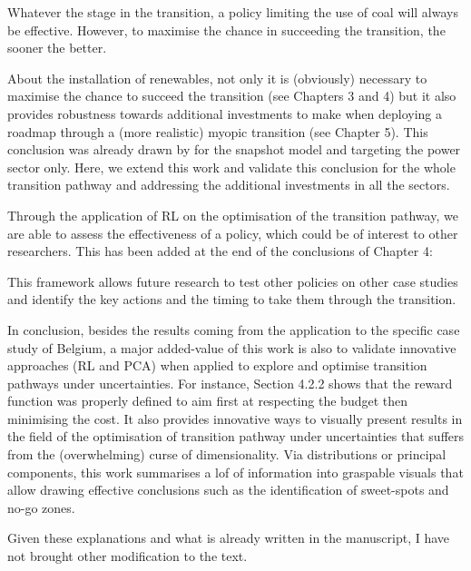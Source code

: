 \documentclass[12pt,a4paper]{article}
\begin{document}
\begin{mdframed}[style=manuscript] 
Whatever the stage in the transition, a policy limiting the use of coal will always be effective. However, to maximise the chance in succeeding the transition, the sooner the better.
\end{mdframed}

About the installation of renewables, not only it is (obviously) necessary to maximise the chance to succeed the transition (see Chapters 3 and 4) but it also provides robustness towards additional investments to make when deploying a roadmap through a (more realistic) myopic transition (see Chapter 5). This conclusion was already drawn by \citet{moret2020overcapacity} for the snapshot model and targeting the power sector only. Here, we extend this work and validate this conclusion for the whole transition pathway and addressing the additional investments in all the sectors.

Through the application of RL on the optimisation of the transition pathway, we are able to assess the effectiveness of a policy, which could be of interest to other researchers. This has been added {\color{blue}at the end of the conclusions of Chapter 4}:

\begin{mdframed}[style=manuscript] 
This framework allows future research to test other policies on other case studies and identify the key actions and the timing to take them through the transition.
\end{mdframed}

In conclusion, besides the results coming from the application to the specific case study of Belgium, a major added-value of this work is also to validate innovative approaches (RL and PCA) when applied to explore and optimise transition pathways under uncertainties. For instance, Section 4.2.2 shows that the reward function was properly defined to aim first at respecting the  budget then minimising the cost. It also provides innovative ways to visually present results in the field of the optimisation of transition pathway under uncertainties that suffers from the (overwhelming) curse of dimensionality. Via distributions or principal components, this work summarises a lof of information into graspable visuals that allow drawing effective conclusions such as the identification of sweet-spots and no-go zones.

Given these explanations and what is already written in the manuscript, I have not brought other modification to the text.
\end{document}
